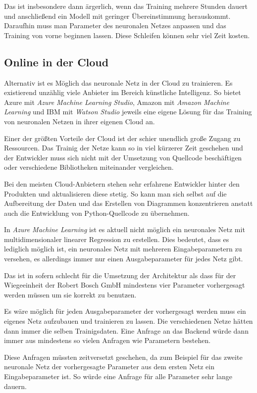Das ist insbesondere dann ärgerlich, wenn das Training mehrere Stunden dauert und anschließend ein Modell mit geringer
Übereinstimmung herauskommt. Daraufhin muss man Parameter des neuronalen Netzes anpassen und das Training von vorne
beginnen lassen. Diese Schleifen können sehr viel Zeit kosten.

\subsection{Online in der Cloud}
Alternativ ist es Möglich das neuronale Netz in der Cloud zu trainieren. Es existierend unzählig viele Anbieter im
Bereich künstliche Intelligenz. So bietet Azure mit \textit{Azure Machine Learning Studio}, Amazon mit
\textit{Amazon Machine Learning} und IBM mit \textit{Watson Studio} jeweils eine eigene Lösung für das Training von
neuronalen Netzen in ihrer eigenen Cloud an.

Einer der größten Vorteile der Cloud ist der schier unendlich große Zugang zu Ressourcen. Das Trainig der Netze kann so
in viel kürzerer Zeit geschehen und der Entwickler muss sich nicht mit der Umsetzung von Quellcode beschäftigen oder
verschiedene Bibliotheken miteinander vergleichen.

Bei den meisten Cloud-Anbietern stehen sehr erfahrene Entwickler hinter den Produkten und aktualisieren diese stetig. So
kann man sich selbst auf die Aufbereitung der Daten und das Erstellen von Diagrammen konzentrieren anstatt auch die
Entwicklung von Python-Quellcode zu übernehmen.

In \textit{Azure Machine Learning} ist es aktuell nicht möglich ein neuronales Netz mit multidimensionaler linearer
Regression zu erstellen. Dies bedeutet, dass es lediglich möglich ist, ein neuronales Netz mit mehreren
Eingabeparametern zu versehen, es allerdings immer nur einen Ausgabeparameter für jedes Netz gibt.

Das ist in sofern schlecht für die Umsetzung der Architektur als dass für der Wiegeeinheit der Robert Bosch GmbH
mindestens vier Parameter vorhergesagt werden müssen um sie korrekt zu benutzen.

Es wäre möglich für jeden Ausgabeparameter der vorhergesagt werden muss ein eigenes Netz aufzubauen und trainieren zu
lassen. Die verschiedenen Netze hätten dann immer die selben Trainigsdaten. Eine Anfrage an das Backend würde dann immer
aus mindestens so vielen Anfragen wie Parametern bestehen.

Diese Anfragen müssten zeitversetzt geschehen, da zum Beispiel für das zweite neuronale Netz der vorhergesagte Parameter
aus dem ersten Netz ein Eingabeparameter ist. So würde eine Anfrage für alle Parameter sehr lange dauern.

